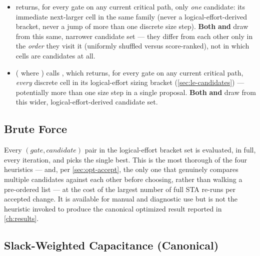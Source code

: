 \begin{itemize}
    \item {} returns, for every gate on any current
          critical path, only \emph{one} candidate: its immediate
          next-larger cell in the same family (never a logical-effort-derived
          bracket, never a jump of more than one discrete size step).
          \textbf{Both}  \textbf{and}
           draw from this same, narrower
          candidate set --- they differ from each other only in the
          \emph{order} they visit it (uniformly shuffled versus
          score-ranked), not in which cells are candidates at all.
    \item {} ( where ) calls
          ,
          which returns, for every gate on any current critical path,
          \emph{every} discrete cell in its logical-effort sizing bracket
          (\cref{sec:le-candidates}) --- potentially more than one size
          step in a single proposal. \textbf{Both} 
          \textbf{and}  draw from this
          wider, logical-effort-derived candidate set.
\end{itemize}

\subsection{Brute Force}
\label{sec:opt-bruteforce}

Every $(gate, candidate)$ pair in the logical-effort bracket set is
evaluated, in full, every iteration, and 
picks the single best. This is the most thorough of the four heuristics
--- and, per \cref{sec:opt-accept}, the only one that genuinely compares
multiple candidates against each other before choosing, rather than
walking a pre-ordered list --- at the cost of the largest number of full
STA re-runs per accepted change. It is available for manual and diagnostic
use but is not the heuristic invoked to produce the canonical optimized
result reported in \cref{ch:results}.

\subsection{Slack-Weighted Capacitance (Canonical)}
\label{sec:opt-swc}

